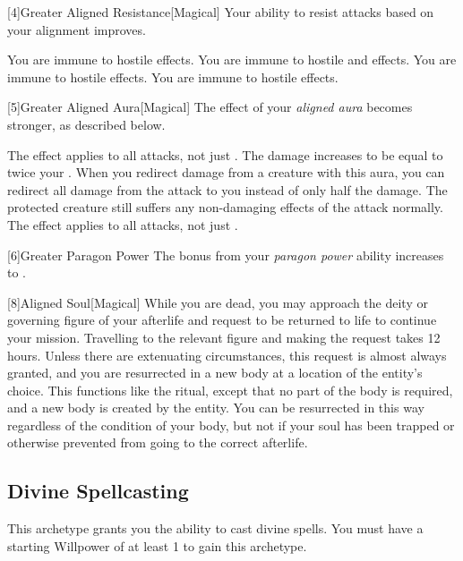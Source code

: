         [4]{Greater Aligned Resistance}[Magical]
        Your ability to resist attacks based on your alignment improves.

         You are immune to hostile  effects.
         You are immune to hostile  and  effects.
         You are immune to hostile  effects.
         You are immune to hostile  effects.

        [5]{Greater Aligned Aura}[Magical]
        The effect of your \textit{aligned aura} becomes stronger, as described below.

         The effect applies to all attacks, not just .
         The damage increases to be equal to twice your .
         When you redirect damage from a creature with this aura, you can redirect all damage from the attack to you instead of only half the damage.
        The protected creature still suffers any non-damaging effects of the attack normally.
         The effect applies to all attacks, not just .

        [6]{Greater Paragon Power} The bonus from your \textit{paragon power} ability increases to .

        [8]{Aligned Soul}[Magical]
        While you are dead, you may approach the deity or governing figure of your afterlife and request to be returned to life to continue your mission.
        Travelling to the relevant figure and making the request takes 12 hours.
        Unless there are extenuating circumstances, this request is almost always granted, and you are resurrected in a new body at a location of the entity's choice.
        This functions like the  ritual, except that no part of the body is required, and a new body is created by the entity.
        You can be resurrected in this way regardless of the condition of your body, but not if your soul has been trapped or otherwise prevented from going to the correct afterlife.

    \subsection{Divine Spellcasting}
        This archetype grants you the ability to cast divine spells.
        You must have a starting Willpower of at least 1 to gain this archetype.

